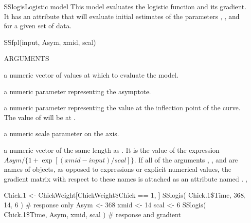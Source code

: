\documentclass[pdftex]{article} \usepackage{url,graphicx}
\begin{document}
\begin{Helpfile}{SSlogis}{Logistic model}
This  model evaluates the logistic
function and its gradient.  It has an  attribute that
will evaluate initial estimates of the parameters ,
, and  for a given set of data.
\begin{Example}
SSfpl(input, Asym, xmid, scal)
\end{Example}
\begin{Argument}{ARGUMENTS}
\item[\Co{input:}]
a numeric vector of values at which to evaluate the model.
\item[\Co{Asym:}]
a numeric parameter representing the asymptote.
\item[\Co{xmid:}]
a numeric parameter representing the  value at the
inflection point of the curve.  The value of  will be
 at .
\item[\Co{scal:}]
a numeric scale parameter on the  axis.
\end{Argument}
a numeric vector of the same length as .  It is the value of
the expression $Asym/\{1+\exp[(xmid-input)/scal]\}$.  If all of
the arguments , , and  are
names of objects, as opposed to expressions or explicit numerical
values, the gradient matrix with respect to these names is attached as
an attribute named .
, 
\need 15pt
\vspace{-16pt} 
\begin{Example}
Chick.1 <- ChickWeight[ChickWeight\$Chick == 1, ]
SSlogis( Chick.1\$Time, 368, 14, 6 )  # response only
Asym <- 368
xmid <- 14
scal <- 6
SSlogis( Chick.1\$Time, Asym, xmid, scal ) # response and gradient
\end{Example}
\end{Helpfile}
\end{document}

